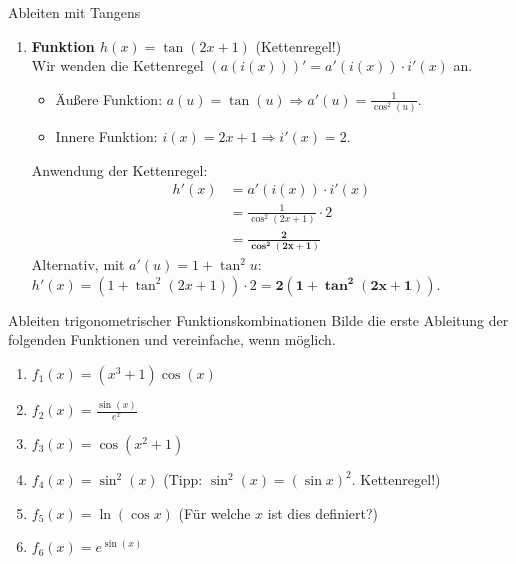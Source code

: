 \begin{loesungsumgebung}{Ableiten mit Tangens}
\begin{enumerate}[label=(\alph*)]
    \item \textbf{Funktion $h(x) = \tan(2x+1)$} (Kettenregel!) \\
    Wir wenden die Kettenregel $(a(i(x)))' = a'(i(x)) \cdot i'(x)$ an.
    \begin{itemize}
        \item Äußere Funktion: $a(u) = \tan(u) \Rightarrow a'(u) = \frac{1}{\cos^2(u)}$.
        \item Innere Funktion: $i(x) = 2x+1 \Rightarrow i'(x) = 2$.
    \end{itemize}
    Anwendung der Kettenregel:
    \begin{align*}
    h'(x) &= a'(i(x)) \cdot i'(x) \\
            &= \frac{1}{\cos^2(2x+1)} \cdot 2 \\
            &= \mathbf{\frac{2}{\cos^2(2x+1)}}
    \end{align*}
    Alternativ, mit $a'(u) = 1+\tan^2 u$:
    $h'(x) = (1+\tan^2(2x+1)) \cdot 2 = \mathbf{2(1+\tan^2(2x+1))}$.
\end{enumerate}

\end{loesungsumgebung}





\begin{aufgabenumgebung}{Ableiten trigonometrischer Funktionskombinationen}
Bilde die erste Ableitung der folgenden Funktionen und vereinfache, wenn möglich.
\begin{enumerate}
    \item $f_1(x) = (x^3+1)\cos(x)$
    \item $f_2(x) = \frac{\sin(x)}{e^x}$
    \item $f_3(x) = \cos(x^2+1)$
    \item $f_4(x) = \sin^2(x)$ (Tipp: $\sin^2(x) = (\sin x)^2$. Kettenregel!)
    \item $f_5(x) = \ln(\cos x)$ (Für welche $x$ ist dies definiert?)
    \item $f_6(x) = e^{\sin(x)}$
\end{enumerate}
\end{aufgabenumgebung}

